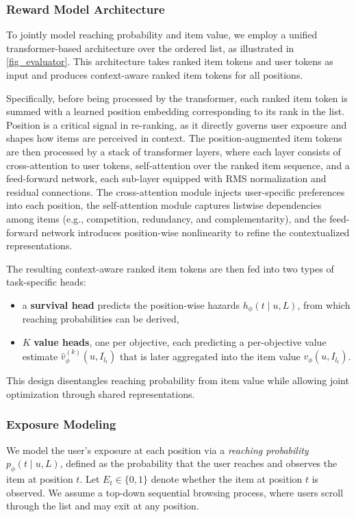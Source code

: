 \documentclass[sigconf]{acmart}
\begin{document}
\subsubsection{Reward Model Architecture}
To jointly model reaching probability and item value, we employ a unified transformer-based architecture over the ordered list, as illustrated in \autoref{fig_evaluator}. This architecture takes ranked item tokens and user tokens as input and produces context-aware ranked item tokens for all positions.

Specifically, before being processed by the transformer, each ranked item token is summed with a learned position embedding corresponding to its rank in the list. Position is a critical signal in re-ranking, as it directly governs user exposure and shapes how items are perceived in context. The position-augmented item tokens are then processed by a stack of transformer layers, where each layer consists of cross-attention to user tokens, self-attention over the ranked item sequence, and a feed-forward network, each sub-layer equipped with RMS normalization and residual connections. The cross-attention module injects user-specific preferences into each position, the self-attention module captures listwise dependencies among items (e.g., competition, redundancy, and complementarity), and the feed-forward network introduces position-wise nonlinearity to refine the contextualized representations.

The resulting context-aware ranked item tokens are then fed into two types of task-specific heads:
\begin{itemize}
    \item a \textbf{survival head} predicts the position-wise hazards $h_\phi(t \mid u, L)$, from which reaching probabilities can be derived,
    \item $K$ \textbf{value heads}, one per objective, each predicting a per-objective value estimate $\hat{v}_\phi^{(k)}(u, I_{l_t})$ that is later aggregated into the item value $v_\phi(u, I_{l_t})$.
\end{itemize}
This design disentangles reaching probability from item value while allowing joint optimization through shared representations.

\subsubsection{Exposure Modeling}
We model the user's exposure at each position via a \emph{reaching probability} $p_\phi(t \mid u, L)$, defined as the probability that the user reaches and observes the item at position $t$. Let $E_t \in \{0,1\}$ denote whether the item at position $t$ is observed. We assume a top-down sequential browsing process, where users scroll through the list and may exit at any position.
\end{document}
